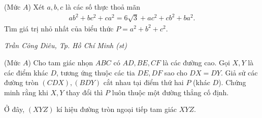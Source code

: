 \begin{multicols}{2}
	{}
	(Mức $A$) Xét $a,b,c$ là các số thực thoả mãn 
	\begin{align*}
		a b^2+b c^2+c a^2=6 \sqrt{3}+a c^2+c b^2+b a^2.
	\end{align*}
	Tìm giá trị nhỏ nhất của biểu thức $P=a^2+b^2+c^2$.
	\begin{flushright}
		\textit{Trần Công Diêu, Tp. Hồ Chí Minh (st)}
	\end{flushright}
	{}
	(Mức $A$) Cho tam giác nhọn $ABC$ có $AD, BE, CF$ là các đường cao. Gọi $X, Y$ là các điểm khác $D$, tương ứng thuộc các tia $DE, DF$ sao cho $DX = DY.$  Giả sử các đường tròn $(CDX), (BDY)$ cắt nhau tại điểm thứ hai $P$ (khác $D$). Chứng minh rằng khi $X, Y$ thay đổi thì $P$ luôn thuộc một đường thẳng cố định.
	
	Ở đây, $(XYZ)$ kí hiệu đường tròn ngoại tiếp tam giác $XYZ.$
	

\end{multicols}
